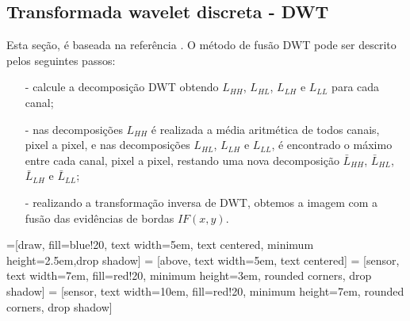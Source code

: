 \documentclass[conference]{IEEEtran}
\begin{document}
\subsection{Transformada wavelet discreta - DWT} Esta seção, é baseada na referência \cite{n_r}. O método de fusão DWT pode ser descrito pelos seguintes passos:
\begin{itemize}
\item[-] calcule a decomposição DWT obtendo $L_{HH}$, $L_{HL}$, $L_{LH}$ e $L_{LL}$ para cada canal;
\item[-] nas decomposições $L_{HH}$ é realizada a média aritmética de todos canais, pixel a pixel, e nas decomposições $L_{HL}$, $L_{LH}$ e $L_{LL}$, é encontrado o máximo entre cada canal, pixel a pixel, restando uma nova decomposição $\bar{L}_{HH}$, $\bar{L}_{HL}$, $\bar{L}_{LH}$ e $\bar{L}_{LL}$;
\item[-] realizando a transformação inversa de DWT, obtemos a imagem com a fusão das evidências de bordas $IF(x,y)$.  
\end{itemize}
=[draw, fill=blue!20, text width=5em, 
    text centered, minimum height=2.5em,drop shadow]
 = [above, text width=5em, text centered]
 = [sensor, text width=7em, fill=red!20, 
    minimum height=3em, rounded corners, drop shadow]
 = [sensor, text width=10em, fill=red!20, 
    minimum height=7em, rounded corners, drop shadow]
\def\blockdist{2.3}
\def\edgedist{2.5}
\end{document}
